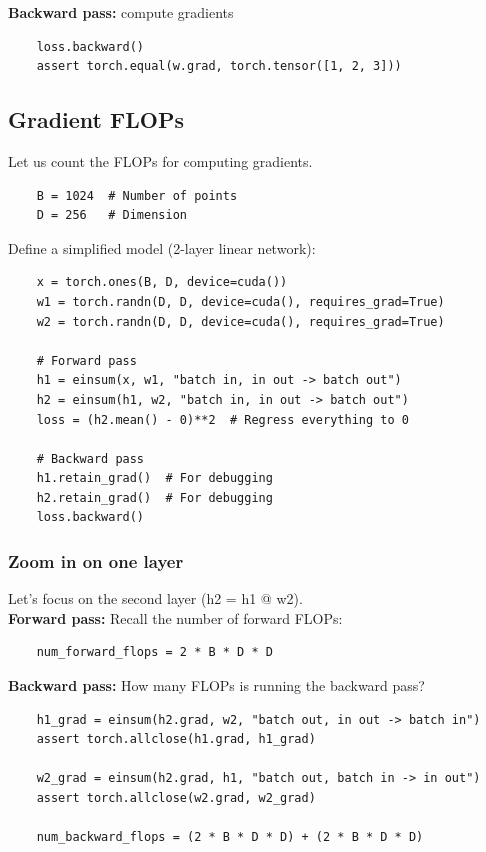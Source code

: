 \documentclass[12pt,twoside]{article}
\begin{document}
\textbf{Backward pass:} compute gradients

\begin{verbatim}
    loss.backward()
    assert torch.equal(w.grad, torch.tensor([1, 2, 3]))
\end{verbatim}

\subsection*{Gradient FLOPs}

Let us count the FLOPs for computing gradients.

\begin{verbatim}
    B = 1024  # Number of points
    D = 256   # Dimension
\end{verbatim}

Define a simplified model (2-layer linear network):

\begin{verbatim}
    x = torch.ones(B, D, device=cuda())
    w1 = torch.randn(D, D, device=cuda(), requires_grad=True)
    w2 = torch.randn(D, D, device=cuda(), requires_grad=True)
    
    # Forward pass
    h1 = einsum(x, w1, "batch in, in out -> batch out")
    h2 = einsum(h1, w2, "batch in, in out -> batch out")
    loss = (h2.mean() - 0)**2  # Regress everything to 0
    
    # Backward pass
    h1.retain_grad()  # For debugging
    h2.retain_grad()  # For debugging
    loss.backward()
\end{verbatim}

\subsubsection*{Zoom in on one layer}

Let's focus on the second layer (h2 = h1 @ w2). \\

\textbf{Forward pass:} Recall the number of forward FLOPs:  

\begin{verbatim}
    num_forward_flops = 2 * B * D * D
\end{verbatim}

\textbf{Backward pass:} How many FLOPs is running the backward pass?

\begin{verbatim}
    h1_grad = einsum(h2.grad, w2, "batch out, in out -> batch in")
    assert torch.allclose(h1.grad, h1_grad)
    
    w2_grad = einsum(h2.grad, h1, "batch out, batch in -> in out")
    assert torch.allclose(w2.grad, w2_grad)
    
    num_backward_flops = (2 * B * D * D) + (2 * B * D * D)
\end{verbatim}
\end{document}

